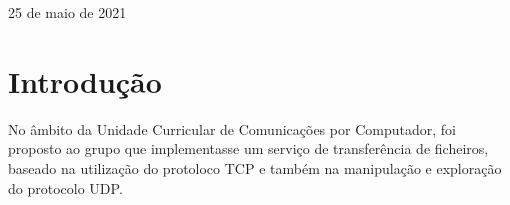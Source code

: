 \documentclass[11pt]{article}
\begin{document}
\begin{titlepage}
\begin{center}
\begin{figure}[hbt!]
                \centering
                \captionsetup{A89572}
            \endminipage\hfill
                \centering
                \captionsetup{A89597}
            \endminipage
        \end{figure}
        
       \vspace{8cm}
        
        25 de maio de 2021
        
    \end{center}
\end{titlepage}

\tableofcontents
\thispagestyle{empty}
\cleardoublepage

\setcounter{page}{1}

\section{Introdução}

\par No âmbito da Unidade Curricular de Comunicações por Computador, foi proposto ao grupo que implementasse um serviço de transferência de ficheiros, baseado na utilização do protoloco TCP e também na manipulação e exploração do protocolo UDP.\\
\end{document}
